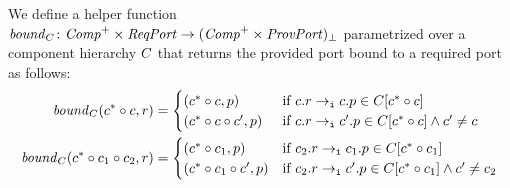 \documentclass[a4paper,10pt,english]{article}
\begin{document}
We define a helper function $\mathit{bound}_C \colon \mathit{Comp}^+ \times \mathit{ReqPort} \rightarrow (\mathit{Comp}^+
\times \mathit{ProvPort})_\bot$ parametrized over a component hierarchy $C$ that returns the provided port bound to a required
port as follows:
\begin{align*}
	\mathit{bound}_C(c^* \circ c, r) &=
		\begin{cases}
			(c^* \circ c, p) & \; \, \text{if } 
				c\mathtt{.}r \; \mathtt{\rightarrow_i} \; c\mathtt{.}p \in
				C[c^* \circ c] \\
			(c^* \circ c \circ c', p) & \; \, \text{if } 
				c\mathtt{.}r \; \mathtt{\rightarrow_i} \; c'\mathtt{.}p \in
				C[c^* \circ c] \wedge c' \neq c
		\end{cases} \\
	\mathit{bound}_C(c^* \circ c_1 \circ c_2, r) &=
		\begin{cases}
			(c^* \circ c_1, p) & \text{if } 
				c_2\mathtt{.}r \; \mathtt{\rightarrow_i} \; c_1\mathtt{.}p \in
				C[c^* \circ c_1] \\
			(c^* \circ c_1 \circ c', p) & \text{if } 
				c_2\mathtt{.}r \; \mathtt{\rightarrow_i} \; c'\mathtt{.}p \in
				C[c^* \circ c_1] \wedge c' \neq c_2
		\end{cases}
\end{align*}
\end{document}
